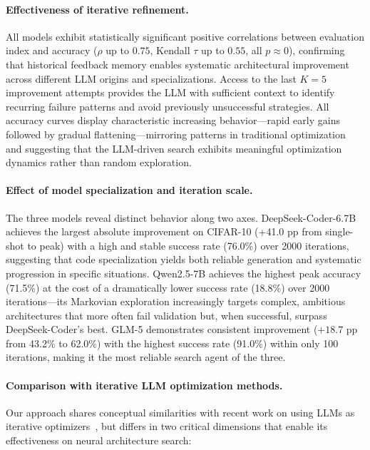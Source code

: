 \documentclass[10pt,twocolumn,letterpaper]{article}
\begin{document}
	\paragraph{Effectiveness of iterative refinement.}
	All models exhibit statistically significant positive correlations between evaluation index and accuracy ($\rho$ up to $0.75$, Kendall $\tau$ up to $0.55$, all $p \approx 0$), confirming that historical feedback memory enables systematic architectural improvement across different LLM origins and specializations. Access to the last $K{=}5$ improvement attempts provides the LLM with sufficient context to identify recurring failure patterns and avoid previously unsuccessful strategies. All accuracy curves display characteristic increasing behavior---rapid early gains followed by gradual flattening---mirroring patterns in traditional optimization and suggesting that the LLM-driven search exhibits meaningful optimization dynamics rather than random exploration.
	
	\paragraph{Effect of model specialization and iteration scale.}
	The three models reveal distinct behavior along two axes. DeepSeek-Coder-6.7B achieves the largest absolute improvement on CIFAR-10 (+41.0 pp from single-shot to peak) with a high and stable success rate (76.0\%) over 2000 iterations, suggesting that code specialization yields both reliable generation and systematic progression in specific situations. Qwen2.5-7B achieves the highest peak accuracy (71.5\%) at the cost of a dramatically lower success rate (18.8\%) over 2000 iterations---its Markovian exploration increasingly targets complex, ambitious architectures that more often fail validation but, when successful, surpass DeepSeek-Coder's best. GLM-5 demonstrates consistent improvement ($+18.7$ pp from 43.2\% to 62.0\%) with the highest success rate (91.0\%) within only 100 iterations, making it the most reliable search agent of the three.
	
	\paragraph{Comparison with iterative LLM optimization methods.}
	Our approach shares conceptual similarities with recent work on using LLMs as 
	iterative optimizers~\cite{Yang2023OPRO,Romera2023FunSearch,Ye2024ReEvo}, but 
	differs in two critical dimensions that enable its effectiveness on neural 
	architecture search:
	
\end{document}
